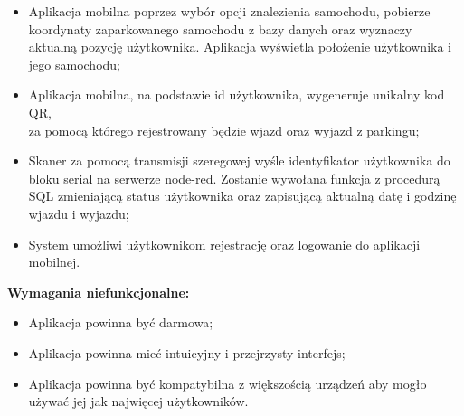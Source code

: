 \documentclass[12pt,a4paper]{article}
\begin{document}
\begin{itemize}
\item Aplikacja mobilna poprzez wybór opcji znalezienia samochodu, pobierze koordynaty zaparkowanego samochodu z bazy danych oraz wyznaczy aktualną pozycję użytkownika. Aplikacja wyświetla położenie użytkownika i jego samochodu;
\item Aplikacja mobilna, na podstawie id użytkownika, wygeneruje unikalny kod QR,\\za pomocą którego rejestrowany będzie wjazd oraz wyjazd z parkingu;
\item Skaner za pomocą transmisji szeregowej wyśle identyfikator użytkownika do bloku serial na serwerze node-red. Zostanie wywołana funkcja z procedurą SQL zmieniającą status użytkownika oraz zapisującą aktualną datę i godzinę wjazdu i wyjazdu;
\item System umożliwi użytkownikom rejestrację oraz logowanie do aplikacji mobilnej.
\end{itemize}
{\large \bf Wymagania niefunkcjonalne:}
\begin{itemize}
\item Aplikacja powinna być darmowa;
\item Aplikacja powinna mieć intuicyjny i przejrzysty interfejs;
\item Aplikacja powinna być kompatybilna z większością urządzeń aby mogło używać jej jak najwięcej użytkowników.
\end{itemize}



\newpage
\end{document}
